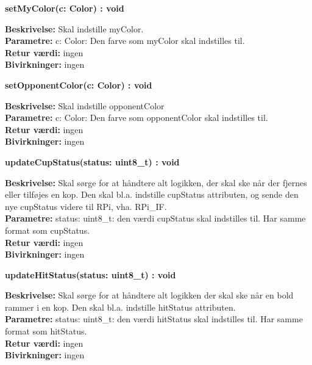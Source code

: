 \documentclass[Arkitektur/System_main.tex]{subfiles}
\begin{document}
    \textbf{setMyColor(c: Color) : void}
    \begin{adjustwidth}{1cm}{0pt}
    \textbf{Beskrivelse:} Skal indstille myColor. \\[0.2cm]
    \textbf{Parametre:} c: Color: Den farve som myColor skal indstilles til. \\[0.2cm]
    \textbf{Retur værdi:} ingen \\[0.2cm]
    \textbf{Bivirkninger:} ingen \\[0.2cm]
    \end{adjustwidth}
    
    \textbf{setOpponentColor(c: Color) : void}
    \begin{adjustwidth}{1cm}{0pt}
    \textbf{Beskrivelse:} Skal indstille opponentColor \\[0.2cm]
    \textbf{Parametre:} c: Color: Den farve som opponentColor skal indstilles til.\\[0.2cm]
    \textbf{Retur værdi:} ingen\\[0.2cm]
    \textbf{Bivirkninger:} ingen\\[0.2cm]
    \end{adjustwidth}
    
    \textbf{updateCupStatus(status: uint8\_t) : void}
    \begin{adjustwidth}{1cm}{0pt}
    \textbf{Beskrivelse:} Skal sørge for at håndtere alt logikken, der skal ske når der fjernes eller tilføjes en kop. Den skal bl.a. indstille cupStatus attributen, og sende den nye cupStatus videre til RPi, vha. RPi\_IF.\\[0.2cm]
    \textbf{Parametre:} status: uint8\_t: den værdi cupStatus skal indstilles til. Har samme format som cupStatus.\\[0.2cm]
    \textbf{Retur værdi:} ingen\\[0.2cm]
    \textbf{Bivirkninger:} ingen\\[0.2cm]
    \end{adjustwidth}
    
    \textbf{updateHitStatus(status: uint8\_t) : void}
    \begin{adjustwidth}{1cm}{0pt}
    \textbf{Beskrivelse:} Skal sørge for at håndtere alt logikken der skal ske når en bold rammer i en kop. Den skal bl.a. indstille hitStatus attributen.\\[0.2cm]
    \textbf{Parametre:} status: uint8\_t: den værdi hitStatus skal indstilles til. Har samme format som hitStatus.\\[0.2cm]
    \textbf{Retur værdi:} ingen\\[0.2cm]
    \textbf{Bivirkninger:} ingen\\[0.2cm]
    \end{adjustwidth}
\end{document}
